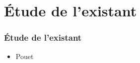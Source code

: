 \section{Étude de l'existant}
  \begin{frame}
    \frametitle{Étude de l'existant}
    \begin{itemize}
      \item Pouet
    \end{itemize}
  \end{frame}

